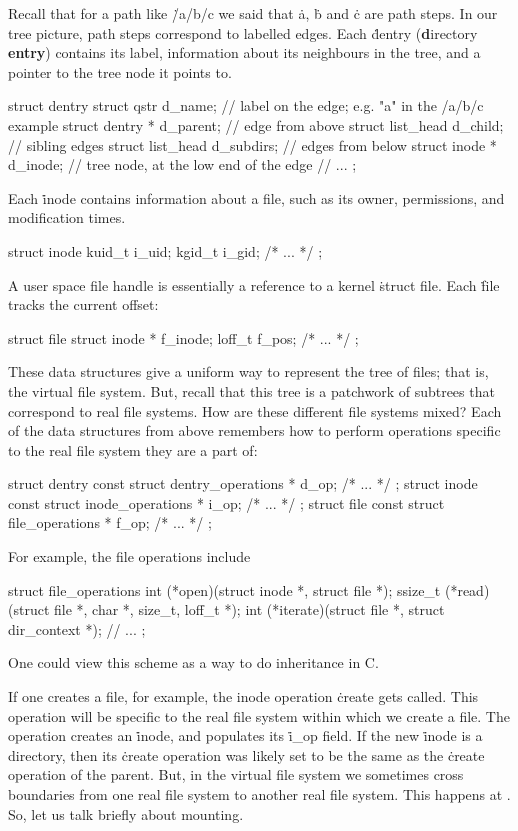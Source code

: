 Recall that for a path like \.{/a/b/c}
  we said that \.{a}, \.{b} and \.{c} are path steps.
In our tree picture,
  path steps correspond to labelled edges.
Each \.{dentry} ({\bf d}irectory {\bf entry}) contains
  its label,
  information about its neighbours in the tree,
  and a pointer to the tree node it points to.
\begin{ccode}
struct dentry {
  struct qstr d_name;  // label on the edge; e.g. "a" in the  /a/b/c example
  struct dentry * d_parent; // edge from above
  struct list_head d_child; // sibling edges
  struct list_head d_subdirs; // edges from below
  struct inode * d_inode; // tree node, at the low end of the edge
  // ...
};
\end{ccode}
Each \.{inode} contains information about a file,
  such as its owner, permissions, and modification times.
\begin{ccode}
struct inode { kuid_t i_uid; kgid_t i_gid; /* ... */ };
\end{ccode}
A user space file handle is essentially a reference to a kernel \.{struct file}.
Each \.{file} tracks the current offset:
\begin{ccode}
struct file { struct inode * f_inode;  loff_t f_pos; /* ... */ };
\end{ccode}

These data structures give a uniform way to represent the tree of files;
  that is, the virtual file system.
But, recall that this tree is a patchwork of subtrees that correspond
  to real file systems.
How are these different file systems mixed?
Each of the data structures from above remembers how to perform operations
  specific to the real file system they are a part of:
\begin{ccode}
struct dentry { const struct dentry_operations * d_op; /* ... */ };
struct inode { const struct inode_operations * i_op; /* ... */ };
struct file { const struct file_operations * f_op; /* ... */ };
\end{ccode}
For example, the file operations include
\begin{ccode}
struct file_operations {
  int (*open)(struct inode *, struct file *);
  ssize_t (*read)(struct file *, char *, size_t, loff_t *);
  int (*iterate)(struct file *, struct dir_context *);
  // ...
};
\end{ccode}
One could view this scheme as a way to do inheritance in C\null.

If one creates a file, for example, the inode operation \.{create} gets called.
This operation will be specific to the real file system
  within which we create a file.
The operation creates an \.{inode}, and populates its \.{i\_op} field.
If the new \.{inode} is a directory,
  then its \.{create} operation was likely set to be the same
  as the \.{create} operation of the parent.
But, in the virtual file system we sometimes cross boundaries
  from one real file system to another real file system.
This happens at .
So, let us talk briefly about mounting.

